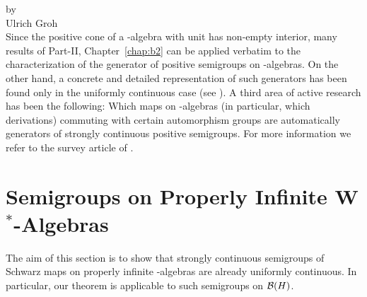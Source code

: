 \label{chap:d2}
\thispagestyle{empty}
{\Large
\vspace*{-.75cm}
by \\[.25em]
Ulrich Groh
\vspace{.75cm}
\\
}
Since the positive cone of a \CA-algebra with unit has non-empty interior, many results of Part-II, Chapter~\ref{chap:b2} can be applied verbatim to the characterization of the generator of positive semigroups on \CA-algebras.
On the other hand, a concrete and detailed representation of such generators has been found only in the uniformly continuous case (see \textcite{lindblad:1976}).
A third area of active research has been the following: Which maps on \CA-algebras (in particular, which derivations) commuting with certain automorphism groups are automatically generators of strongly continuous positive semigroups.
For more information we refer to the survey article of \textcite{evans:1984}.
\section{Semigroups on Properly Infinite \texorpdfstring{W$^{*}$-Algebras}{W\textsuperscript{*}-Algebras}}
The aim of this section is to show that strongly continuous semigroups of Schwarz maps on properly infinite \WA-algebras are already uniformly continuous.
In particular, our theorem is applicable to such semigroups on $\mathcal{B}(H)$.

